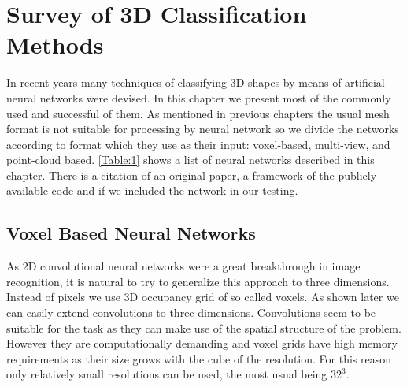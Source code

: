 \chapter{Survey of 3D Classification Methods}
\label{sec:chap3}
In recent years many techniques of classifying 3D shapes by means of artificial neural networks were devised. In this chapter we present most of the commonly used and successful of them. As mentioned in previous chapters the usual mesh format is not suitable for processing by neural network so we divide the networks according to format which they use as their input: voxel-based, multi-view, and point-cloud based. \ref{Table:1} shows a list of neural networks described in this chapter. There is a citation of an original paper, a framework of the publicly available code and if we included the network in our testing.



\section{Voxel Based Neural Networks}
As 2D convolutional neural networks were a great breakthrough in image recognition, it is natural to try to generalize this approach to three dimensions. Instead of pixels we use 3D occupancy grid of so called voxels. As shown later we can easily extend convolutions to three dimensions. Convolutions seem to be suitable for the task as they can make use of the spatial structure of the problem. However they are computationally demanding and voxel grids have high memory requirements as their size grows with the cube of the resolution. For this reason only relatively small resolutions can be used, the most usual being $32^3$. 

